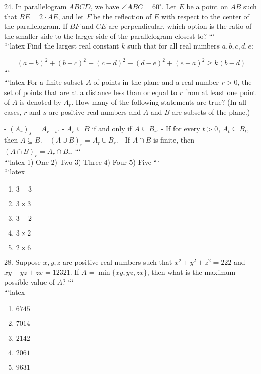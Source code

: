 24. In parallelogram $ABCD$, we have $\angle ABC = 60^\circ$. Let $E$ be a point on $AB$ such that $BE = 2 \cdot AE$, and let $F$ be the reflection of $E$ with respect to the center of the parallelogram. If $BF$ and $CE$ are perpendicular, which option is the ratio of the smaller side to the larger side of the parallelogram closest to?
```
\\
```latex
Find the largest real constant $k$ such that for all real numbers $a, b, c, d, e$:

$$(a - b)^2 + (b - c)^2 + (c - d)^2 + (d - e)^2 + (e - a)^2 \geq k(b - d)$$
```
\\
```latex
For a finite subset $A$ of points in the plane and a real number $r > 0$, the set of points that are at a distance less than or equal to $r$ from at least one point of $A$ is denoted by $A_r$. How many of the following statements are true? (In all cases, $r$ and $s$ are positive real numbers and $A$ and $B$ are subsets of the plane.)

- $(A_r)_s = A_{r+s}$.
- $A_r \subseteq B$ if and only if $A \subseteq B_r$.
- If for every $t > 0$, $A_t \subseteq B_t$, then $A \subseteq B$.
- $(A \cup B)_r = A_r \cup B_r$.
- If $A \cap B$ is finite, then $(A \cap B)_r = A_r \cap B_r$.
```
\\
```latex
1) One  2) Two  3) Three  4) Four  5) Five
```
\\
```latex
\begin{enumerate}
    \item $3 - 3$
    \item $3 \times 3$
    \item $3 - 2$
    \item $3 \times 2$
    \item $2 \times 6$
\end{enumerate}

28. Suppose $x, y, z$ are positive real numbers such that $x^2 + y^2 + z^2 = 222$ and $xy + yz + zx = 12321$. If $A = \min\{xy, yz, zx\}$, then what is the maximum possible value of $A$?
```
\\
```latex
\begin{enumerate}
    \item $6745$
    \item $7014$
    \item $2142$
    \item $2061$
    \item $9631$
\end{enumerate}

